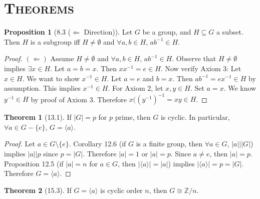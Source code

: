 \documentclass{article}
\newcommand{\Z}{\mathbb{Z}}
\newcommand{\es}{\emptyset}
\newcommand{\inverse}[1]{#1^{-1}}
\newcommand{\gen}[1]{\langle#1\rangle}
\theoremstyle{definition}
\newtheorem*{thm}{Theorem}
\newtheorem*{prop}{Proposition}
\theoremstyle{remark}
\begin{document}
    \noindent\section*{\textbf{\textsc{Theorems}}}{
        \begin{prop}[8.3 ($\Leftarrow$ Direction)]
            Let $G$ be a group, and $H\subseteq G$ a subset. Then $H$ is a subgroup iff $H \neq \es$ and $\forall a,b \in H$, $a\inverse{b} \in H$.
        \end{prop}
        
        \begin{proof}
            $(\Leftarrow)$ Assume $H\neq \es$ and $\forall a,b \in H, \, a\inverse{b}\in H$. Observe that $H \neq \es$ implies $\exists x \in H$. Let $a=b=x$. Then $x\inverse{x}=e \in H$. Now verify Axiom 3: Let $x\in H$. We want to show $\inverse{x}\in H$. Let $a=e$ and $b=x$. Then $a\inverse{b}=e\inverse{x}\in H$ by assumption. This implies $\inverse{x}\in H$. For Axiom 2, let $x,y\in H$. Set $a=x$. We know $\inverse{y}\in H$ by proof of Axiom 3. Therefore $x(\inverse{(\inverse{y})}=xy \in H$.
        \end{proof}
        
        \begin{thm}[13.1]
            If $|G|=p$ for $p$ prime, then $G$ is cyclic. In particular, $\forall a \in G-\{e\}$, $G=\gen{a}$.
        \end{thm}
        
        \begin{proof}
            Let $a\in G\setminus\{e\}$. Corollary 12.6 (if $G$ is a finite group, then $\forall a \in G, \, |a|\big||G|$) implies $|a|\big|p$ since $p=|G|$. Therefore $|a|=1$ or $|a|=p$. Since $a\neq e$, then $|a|=p$. Proposition 12.5 (if $|a|=n$ for $a \in G$, then $|\gen{a}|=|a|$) implies $|\gen{a}|=p=|G|$. Therefore $G=\gen{a}$. 
        \end{proof}
        
        \begin{thm}[15.3]
            If $G=\gen{a}$ is cyclic order $n$, then $G\cong \Z/n$.
        \end{thm}
        
}
\end{document}
